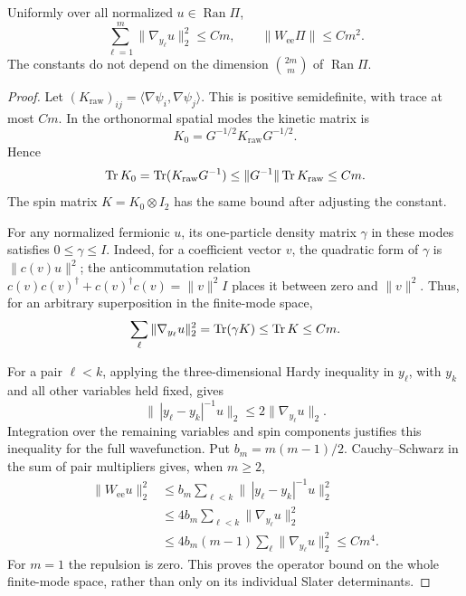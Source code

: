 \begin{lemma}
\label{lem:fermion-hardy}
Uniformly over all normalized \(u\in\operatorname{Ran}\Pi\),
\begin{equation}
 \sum_{\ell=1}^m\|\nabla_{y_\ell}u\|_2^2\le Cm,
 \qquad
 \|W_{\mathrm{ee}}\Pi\|\le Cm^2.
 \label{eq:continuum-fermion-hardy}
\end{equation}
The constants do not depend on the dimension
\(\binom{2m}{m}\) of \(\operatorname{Ran}\Pi\).
\end{lemma}

\begin{proof}
Let \((K_{\mathrm{raw}})_{ij}
=\langle\nabla\psi_i,\nabla\psi_j\rangle\).  This is positive
semidefinite, with trace at most \(Cm\).
In the orthonormal spatial modes the kinetic matrix is
\[
 K_0=G^{-1/2}K_{\mathrm{raw}}G^{-1/2}.
\]
Hence
\[
 \operatorname{Tr} K_0
 =\operatorname{Tr}(K_{\mathrm{raw}}G^{-1})
 \le\|G^{-1}\|\operatorname{Tr} K_{\mathrm{raw}}\le Cm.
\]
The spin matrix \(K=K_0\otimes I_2\) has the same bound after
adjusting the constant.

For any normalized fermionic \(u\), its one-particle density
matrix \(\gamma\) in these modes satisfies \(0\le\gamma\le I\).
Indeed, for a coefficient vector \(v\), the quadratic form of
\(\gamma\) is \(\|c(v)u\|^2\); the anticommutation relation
\(c(v)c(v)^\dagger+c(v)^\dagger c(v)=\|v\|^2I\)
places it between zero and \(\|v\|^2\).
Thus, for an arbitrary superposition in the finite-mode space,
\[
 \sum_\ell\|\nabla_{y_\ell}u\|_2^2
 =\operatorname{Tr}(\gamma K)\le\operatorname{Tr} K\le Cm.
\]

For a pair \(\ell<k\), applying the three-dimensional Hardy
inequality in \(y_\ell\), with \(y_k\) and all other variables
held fixed, gives
\[
 \|\,|y_\ell-y_k|^{-1}u\|_2
 \le2\|\nabla_{y_\ell}u\|_2.
\]
Integration over the remaining variables and spin components
justifies this inequality for the full wavefunction.
Put \(b_m=m(m-1)/2\).  Cauchy--Schwarz in the sum of pair
multipliers gives, when \(m\ge2\),
\begin{align*}
 \|W_{\mathrm{ee}}u\|_2^2
 &\le b_m\sum_{\ell<k}
          \|\,|y_\ell-y_k|^{-1}u\|_2^2\\
 &\le4b_m\sum_{\ell<k}\|\nabla_{y_\ell}u\|_2^2\\
 &\le4b_m(m-1)\sum_\ell\|\nabla_{y_\ell}u\|_2^2
 \le Cm^4.
\end{align*}
For \(m=1\) the repulsion is zero.  This proves the operator
bound on the whole finite-mode space, rather than only on its
individual Slater determinants.
\end{proof}

